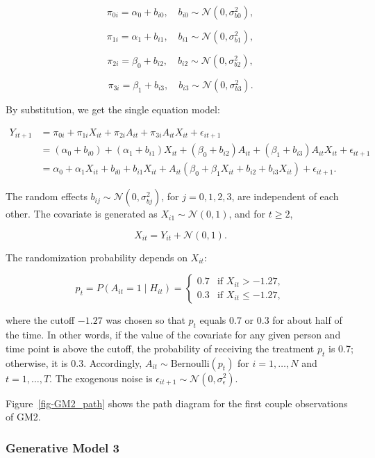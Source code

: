 \documentclass[
  12pt,
  a4paper,
]{article}
\begin{document}
\[
\pi_{0i} = \alpha_0 + b_{i0}, \quad b_{i0} \sim \mathcal{N}(0, \sigma_{b0}^2),
\]

\[
\pi_{1i} = \alpha_1 + b_{i1}, \quad b_{i1} \sim \mathcal{N}(0, \sigma_{b1}^2),
\]

\[
\pi_{2i} = \beta_0 + b_{i2}, \quad b_{i2} \sim \mathcal{N}(0, \sigma_{b2}^2),
\]

\[
\pi_{3i} = \beta_1 + b_{i3}, \quad b_{i3} \sim \mathcal{N}(0, \sigma_{b3}^2).
\]

By substitution, we get the single equation model:

\[
\begin{aligned}
Y_{it+1} &= \pi_{0i} + \pi_{1i} X_{it} + \pi_{2i} A_{it} + \pi_{3i} A_{it} X_{it} + \epsilon_{it+1} \\ 
&= (\alpha_0 + b_{i0}) + (\alpha_1 + b_{i1}) X_{it} + (\beta_0 + b_{i2}) A_{it} + (\beta_1 + b_{i3}) A_{it} X_{it} + \epsilon_{it+1} \\ 
&= \alpha_0 + \alpha_1 X_{it} + b_{i0} + b_{i1} X_{it} + A_{it} \left( \beta_0 + \beta_1 X_{it} + b_{i2} + b_{i3} X_{it} \right) + \epsilon_{it+1}.
\end{aligned}
\]

The random effects \(b_{ij} \sim \mathcal{N}(0, \sigma_{bj}^2)\), for
\(j = 0, 1, 2, 3\), are independent of each other. The covariate is
generated as \(X_{i1} \sim \mathcal{N}(0, 1)\), and for \(t \geq 2\),

\[
X_{it} = Y_{it} + \mathcal{N}(0, 1).
\]

The randomization probability depends on \(X_{it}\):

\[
p_t = P(A_{it} = 1 \mid H_{it}) = 
\begin{cases} 
0.7 & \text{if } X_{it} > -1.27, \\
0.3 & \text{if } X_{it} \leq -1.27,
\end{cases}
\]

where the cutoff \(-1.27\) was chosen so that \(p_t\) equals 0.7 or 0.3
for about half of the time. In other words, if the value of the
covariate for any given person and time point is above the cutoff, the
probability of receiving the treatment \(p_t\) is 0.7; otherwise, it is
0.3. Accordingly, \(A_{it} \sim \text{Bernoulli}(p_t)\) for
\(i = 1, \ldots, N\) and \(t = 1, \ldots, T\). The exogenous noise is
\(\epsilon_{it+1} \sim \mathcal{N}(0, \sigma_\epsilon^2)\).

Figure~\ref{fig-GM2_path} shows the path diagram for the first couple
observations of GM2.

\subsubsection{Generative Model 3}\label{generative-model-3}
\end{document}
